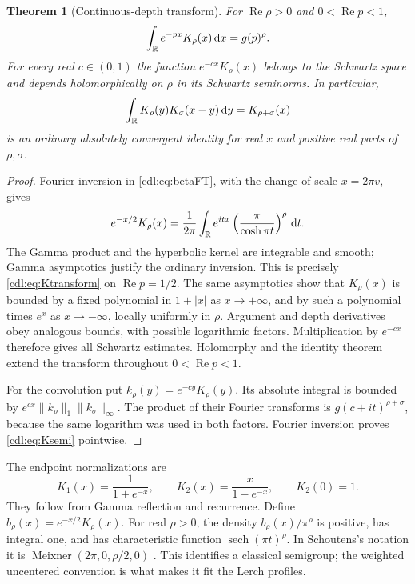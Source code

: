 \documentclass[11pt,letterpaper]{article}
\numberwithin{equation}{section}
\newtheorem{theorem}{Theorem}[section]
\theoremstyle{definition}\newtheorem{definition}[theorem]{Definition}
\theoremstyle{remark}\newtheorem{remark}[theorem]{Remark}
\newcommand{\Rea}{\operatorname{Re}}\newcommand{\Ima}{\operatorname{Im}}
\begin{document}
\begin{theorem}[Continuous-depth transform]\label{cdl:thm:kernel}
For $\Rea\rho>0$ and $0<\Rea p<1$,
\begin{equation}\label{cdl:eq:Ktransform}
 \int_\mathbb R e^{-px}K_\rho(x)\,\mathrm d x=g(p)^\rho.
\end{equation}
For every real $c\in(0,1)$ the function $e^{-cx}K_\rho(x)$ belongs to the
Schwartz space and depends holomorphically on $\rho$ in its Schwartz
seminorms. In particular,
\begin{equation}\label{cdl:eq:Ksemi}
 \int_\mathbb R K_\rho(y)K_\sigma(x-y)\,\mathrm d y=K_{\rho+\sigma}(x)
\end{equation}
is an ordinary absolutely convergent identity for real $x$ and positive
real parts of $\rho,\sigma$.
\end{theorem}
\begin{proof}
Fourier inversion in \eqref{cdl:eq:betaFT}, with the change of scale
$x=2\pi v$, gives
\[
 e^{-x/2}K_\rho(x)=\frac1{2\pi}
 \int_\mathbb R e^{itx}\left(\frac\pi{\cosh\pi t}\right)^\rho\,\mathrm d t.
\]
The Gamma product and the hyperbolic kernel are integrable and smooth;
Gamma asymptotics justify the ordinary inversion. This is precisely
\eqref{cdl:eq:Ktransform} on $\Rea p=1/2$. The same asymptotics show
that $K_\rho(x)$ is bounded by a fixed polynomial in $1+|x|$ as
$x\to+\infty$, and by such a polynomial times $e^x$ as
$x\to-\infty$, locally uniformly in $\rho$. Argument and depth
derivatives obey analogous bounds, with possible logarithmic factors.
Multiplication by $e^{-cx}$ therefore gives all Schwartz estimates.
Holomorphy and the identity theorem extend the transform throughout
$0<\Rea p<1$.

For the convolution put $k_\rho(y)=e^{-cy}K_\rho(y)$. Its absolute
integral is bounded by
$e^{cx}\|k_\rho\|_1\|k_\sigma\|_\infty$.
The product of their Fourier transforms is
$g(c+it)^{\rho+\sigma}$, because the same logarithm was used in both
factors. Fourier inversion proves \eqref{cdl:eq:Ksemi} pointwise.
\end{proof}

The endpoint normalizations are
\begin{equation}\label{cdl:eq:seeds}
 K_1(x)=\frac1{1+e^{-x}},\qquad
 K_2(x)=\frac{x}{1-e^{-x}},\qquad K_2(0)=1.
\end{equation}
They follow from Gamma reflection and recurrence. Define
$b_\rho(x)=e^{-x/2}K_\rho(x)$. For real $\rho>0$, the density
$b_\rho(x)/\pi^\rho$ is positive, has integral one, and has characteristic
function $\operatorname{sech}(\pi t)^\rho$. In Schoutens's notation it is
$\operatorname{Meixner}(2\pi,0,\rho/2,0)$ \cite{Schoutens}.
This identifies a classical semigroup; the weighted uncentered convention
is what makes it fit the Lerch profiles.
\end{document}
